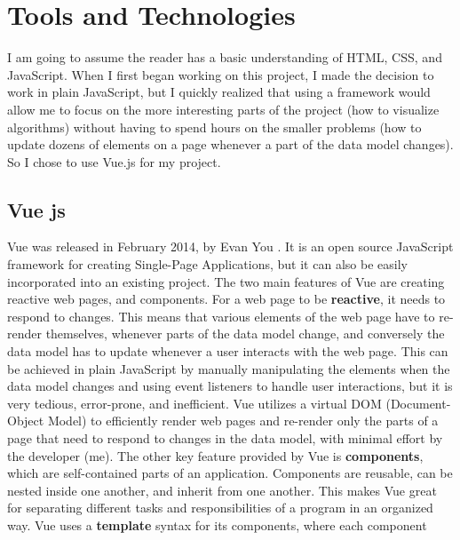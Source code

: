 \chapter{Tools and Technologies}
\label{tools-and-technologies}
I am going to assume the reader has a basic understanding of HTML, CSS, and JavaScript.
When I first began working on this project, I made the decision to work in plain 
JavaScript, but I quickly realized that using a framework would allow me to focus 
on the more interesting parts of the project (how to visualize algorithms) without 
having to spend hours on the smaller problems 
(how to update dozens of elements on a page whenever a part of the data model changes).
So I chose to use Vue.js for my project. 
\section{Vue js}
\hspace{-0.25in}Vue was released in February 2014, by Evan You  \cite{vue-launch}. 
It is an open source JavaScript framework
for creating Single-Page Applications, but 
it can also be easily incorporated into an existing project. 
The two main features of Vue are creating reactive web pages, and components.
\newline\newline
For a web page to be \textbf{reactive}, it needs to respond to changes. This means
that various elements of the web page have to re-render themselves, whenever
parts of the data model change, and conversely the data model has to update whenever
a user interacts with the web page. 
This can be achieved in plain JavaScript by manually manipulating the elements
when the data model changes and using event listeners to handle user interactions, 
but it is very tedious, error-prone, and inefficient. 
Vue utilizes a virtual DOM (Document-Object Model) to efficiently 
render web pages and re-render only the parts of a page
that need to respond to changes in the data model, 
with minimal effort by the developer (me).
\newline\newline
The other key feature provided by Vue is \textbf{components}, which are 
self-contained parts of an application. 
Components are reusable, can be nested inside one another, and inherit from one another.
This makes Vue great for separating different tasks and responsibilities
of a program in an organized way. 
Vue uses a \textbf{template} syntax for its components, where each component 
